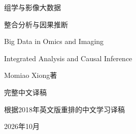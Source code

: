 
\begin{titlepage}
\centering
\vspace*{2.5cm}
{\heiti{}组学与影像大数据\par}
\vspace{.65cm}
{\heiti{}整合分析与因果推断\par}
\vspace{1cm}
{\large Big Data in Omics and Imaging\par}
{\large Integrated Analysis and Causal Inference\par}
\vspace{1.8cm}
{\Large Momiao Xiong\quad 著\par}
\vspace{.8cm}
{\large 完整中文译稿\par}
\vfill
{\small 根据2018年英文版重排的中文学习译稿\par}
{\small 2026年10月\par}
\end{titlepage}
